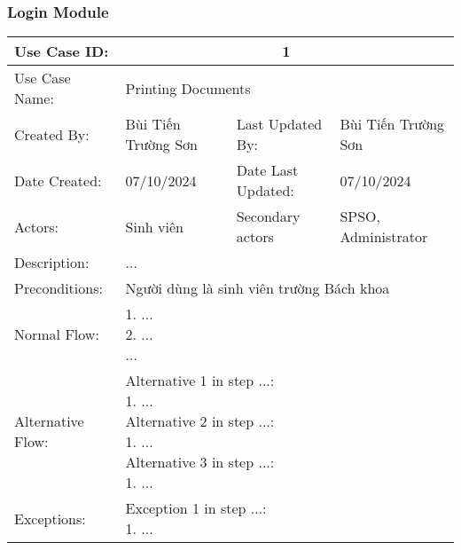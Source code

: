 \subsubsection{Login Module}
\begin{table}[h!]
    \centering
    \begin{tabular}{ |p{4cm}|p{3cm}|p{3cm}|p{3cm}|  }
        \hline
        Use Case ID:      & \multicolumn{3}{c|}{1}                                                                               \\
        \hline
        Use Case Name:    & \multicolumn{3}{l|}{Printing Documents}                                                              \\
        \hline
        Created By:       & Bùi Tiến Trường Sơn                                       & Last Updated By:   & Bùi Tiến Trường Sơn \\
        \hline
        Date Created:     & 07/10/2024                                                & Date Last Updated: & 07/10/2024          \\
        \hline
        Actors:           & Sinh viên                                                 & Secondary actors   &         SPSO, Administrator           \\
        \hline
        Description:      & \multicolumn{3}{p{10cm}|}{...} \\
        \hline
        Preconditions:    & \multicolumn{3}{p{10cm}|}{Người dùng là sinh viên trường Bách khoa}           \\
        \hline
        Normal Flow:      & \multicolumn{3}{p{10cm}|}{
            1. ...\newline
			2. ...\newline
			...
        }                                                                                                                        \\
        \hline
        Alternative Flow: & \multicolumn{3}{p{10cm}|}{
            Alternative 1 in step ...:\newline
            1. ...\newline
            Alternative 2 in step ...:\newline
            1. ...\newline
            Alternative 3 in step ...:\newline
            1. ...
			
        }                                                                                                                        \\
        \hline
        Exceptions:       & \multicolumn{3}{p{10cm}|}{
            Exception 1 in step ...:\newline
            1. ...

        }                                                                                                                        \\
        \hline
    \end{tabular}
\end{table}
\newpage